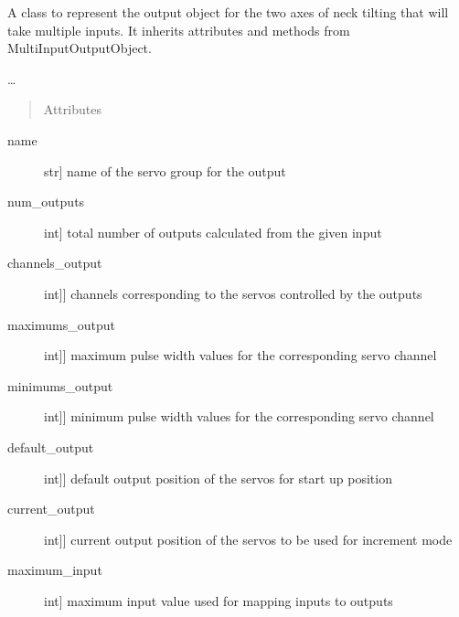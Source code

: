 \documentclass[letterpaper,10pt,english]{sphinxmanual}
\begin{document}
\begin{fulllineitems}
\label{\detokenize{specific:NeckTiltOutput.NeckTiltOutput}}
\sphinxAtStartPar
A class to represent the output object for the two axes of neck tilting that will take multiple inputs.
It inherits attributes and methods from MultiInputOutputObject.

\sphinxAtStartPar
…
\begin{quote}\begin{description}
\item[{Attributes}] \leavevmode
\end{description}\end{quote}
\begin{description}
\item[{name}] \leavevmode{[}str{]}
\sphinxAtStartPar
name of the servo group for the output

\item[{num\_outputs}] \leavevmode{[}int{]}
\sphinxAtStartPar
total number of outputs calculated from the given input

\item[{channels\_output}] \leavevmode{[}{[}int{]}{]}
\sphinxAtStartPar
channels corresponding to the servos controlled by the outputs

\item[{maximums\_output}] \leavevmode{[}{[}int{]}{]}
\sphinxAtStartPar
maximum pulse width values for the corresponding servo channel

\item[{minimums\_output}] \leavevmode{[}{[}int{]}{]}
\sphinxAtStartPar
minimum pulse width values for the corresponding servo channel

\item[{default\_output}] \leavevmode{[}{[}int{]}{]}
\sphinxAtStartPar
default output position of the servos for start up position

\item[{current\_output}] \leavevmode{[}{[}int{]}{]}
\sphinxAtStartPar
current output position of the servos to be used for increment mode

\item[{maximum\_input}] \leavevmode{[}int{]}
\sphinxAtStartPar
maximum input value used for mapping inputs to outputs


\end{description}
\end{fulllineitems}
\end{document}
